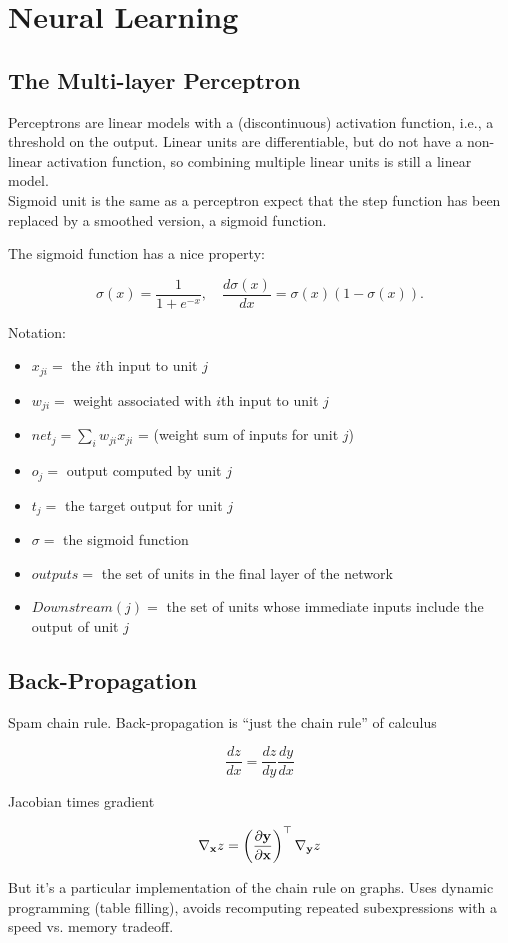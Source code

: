 \section{Neural Learning}

\subsection{The Multi-layer Perceptron}

Perceptrons are linear models with a (discontinuous) activation function, i.e., a threshold on the output. Linear units are differentiable, but do not have a non-linear activation function, so combining multiple linear units is still a linear model. \\

Sigmoid unit is the same as a perceptron expect that the step function has been replaced by a smoothed version, a sigmoid function.

The sigmoid function has a nice property:

\[\sigma(x) = \frac{1}{1 + e^{-x}}, \quad \frac{d\sigma(x)}{dx} = \sigma(x)(1 - \sigma(x)).\]

Notation:
\begin{itemize}
    \item \(x_{ji} =\) the \(i\)th input to unit \(j\)
    \item \(w_{ji} =\) weight associated with \(i\)th input to unit \(j\)
    \item \(net_j = \sum_i w_{ji}x_{ji}\) = (weight sum of inputs for unit \(j\))
    \item \(o_j =\) output computed by unit \(j\)
    \item \(t_j =\) the target output for unit \(j\)
    \item \(\sigma =\) the sigmoid function
    \item \(outputs =\) the set of units in the final layer of the network
    \item \(Downstream(j) =\) the set of units whose immediate inputs include the output of unit \(j\)
\end{itemize}

\subsection{Back-Propagation}

Spam chain rule. Back-propagation is ``just the chain rule'' of calculus

\[\frac{dz}{dx} = \frac{dz}{dy}\frac{dy}{dx}\]

Jacobian times gradient

\[\nabla_{\mathbf{x}} z = \left(\frac{\partial \mathbf{y}}{\partial \mathbf{x}}\right)^\top \nabla_{\mathbf{y}} z\]

But it's a particular implementation of the chain rule on graphs. Uses dynamic programming (table filling), avoids recomputing repeated subexpressions with a speed vs. memory tradeoff.
